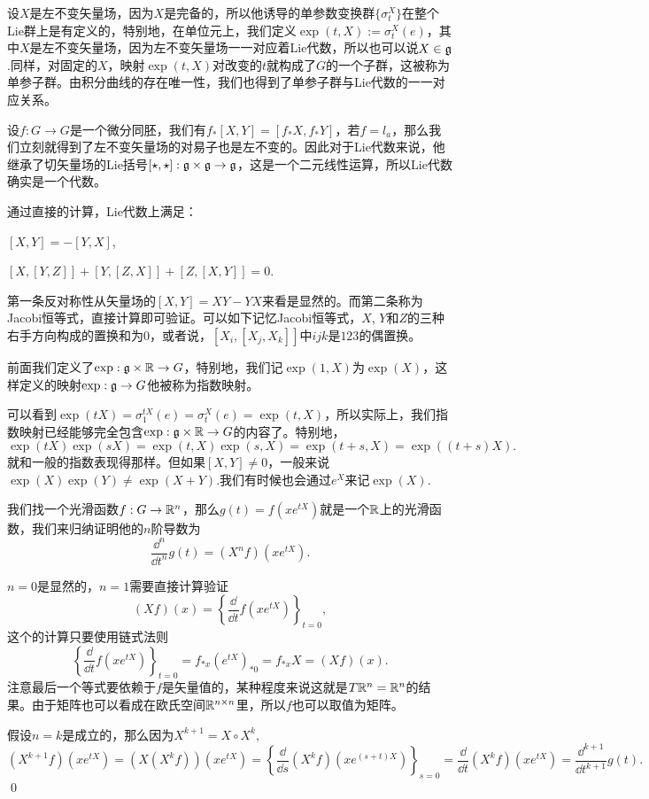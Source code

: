 \para 设$X$是左不变矢量场，因为$X$是完备的，所以他诱导的单参数变换群$\{\sigma^X_t\}$在整个Lie群上是有定义的，特别地，在单位元上，我们定义$\exp(t,X):=\sigma^X_t(e)$，其中$X$是左不变矢量场，因为左不变矢量场一一对应着Lie代数，所以也可以说$X\in {\mathfrak{g}}$.同样，对固定的$X$，映射$\exp(t,X)$对改变的$t$就构成了$G$的一个子群，这被称为单参子群。由积分曲线的存在唯一性，我们也得到了单参子群与Lie代数的一一对应关系。

\pro 设$f:G\to G$是一个微分同胚，我们有$f_*[X,Y]=[f_*X,f_*Y]$，若$f=l_a$，那么我们立刻就得到了左不变矢量场的对易子也是左不变的。因此对于Lie代数来说，他继承了切矢量场的Lie括号$[\star,\star]:{\mathfrak{g}}\times {\mathfrak{g}}\to {\mathfrak{g}}$，这是一个二元线性运算，所以Lie代数确实是一个代数。

通过直接的计算，Lie代数上满足：

 $[X,Y]=-[Y,X]$,

 $[X,[Y,Z]]+[Y,[Z,X]]+[Z,[X,Y]]=0$.

第一条反对称性从矢量场的$[X,Y]=XY-YX$来看是显然的。而第二条称为Jacobi恒等式，直接计算即可验证。可以如下记忆Jacobi恒等式，$X$, $Y$和$Z$的三种右手方向构成的置换和为$0$，或者说，$[X_i,[X_j,X_k]]$中$ijk$是$123$的偶置换。

\para 前面我们定义了$\exp:{\mathfrak{g}}\times \mathbb{R}\to G$，特别地，我们记$\exp(1,X)$为$\exp(X)$，这样定义的映射$\exp:{\mathfrak{g}}\to G$他被称为指数映射。

可以看到$\exp(tX)=\sigma^{tX}_1(e)=\sigma^{X}_t(e)=\exp(t,X)$，所以实际上，我们指数映射已经能够完全包含$\exp:{\mathfrak{g}}\times \mathbb{R}\to G$的内容了。特别地，
\[
	\exp(tX)\exp(sX)=\exp(t,X)\exp(s,X)=\exp(t+s,X)=\exp((t+s)X).
\]
就和一般的指数表现得那样。但如果$[X,Y]\neq 0$，一般来说$\exp(X)\exp(Y)\neq \exp(X+Y)$.我们有时候也会通过$e^{X}$来记$\exp(X)$.

\lem \label{exp}我们找一个光滑函数$f:G\to \mathbb{R}^n$，那么$g(t)=f(xe^{tX})$就是一个$\mathbb{R}$上的光滑函数，我们来归纳证明他的$n$阶导数为
\[
	\frac{\dd^n}{\dd t^n}g(t)=(X^nf)(x e^{tX}).
\]

\proof $n=0$是显然的，$n=1$需要直接计算验证
\[
	(Xf)(x)=\left\{\frac{\dd}{\dd t}f(x e^{tX})\right\}_{t=0},
\]
这个的计算只要使用链式法则
\[
	\left\{\frac{\dd}{\dd t}f(x e^{tX})\right\}_{t=0}=f_{*x}(e^{tX})_{*0}=f_{*x}X=(Xf)(x).
\]
注意最后一个等式要依赖于$f$是矢量值的，某种程度来说这就是$T\mathbb{R}^n=\mathbb{R}^n$的结果。由于矩阵也可以看成在欧氏空间$\mathbb{R}^{n\times n}$里，所以$f$也可以取值为矩阵。

假设$n=k$是成立的，那么因为$X^{k+1}=X\circ X^k$,
\[
	(X^{k+1}f)(x e^{tX})=(X(X^{k}f))(x e^{tX})=\left\{\frac{\dd}{\dd s}(X^kf)(x e^{(s+t)X})\right\}_{s=0}=\frac{\dd}{\dd t}(X^kf)(x e^{tX})=\frac{\dd^{k+1}}{\dd t^{k+1}}g(t).
\]\qed

